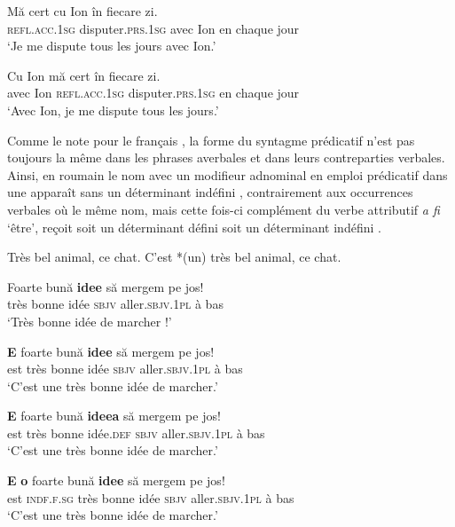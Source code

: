 \ea \label{ch1:ex35}
\ea
\gll   Mă  cert  cu  Ion  în  fiecare  zi.\\
\textsc{refl.acc.1sg} disputer.\textsc{prs.1sg}  avec  Ion  en  chaque  jour\\
\glt ‘Je me dispute tous les jours avec Ion.’ 

\ex
\gll  Cu  Ion  mă  cert  în  fiecare  zi.\\
  avec  Ion  \textsc{refl.acc.1sg} disputer.\textsc{prs.1sg}  en  chaque  jour\\
\glt ‘Avec Ion, je me dispute tous les jours.’ 
\z
\z

Comme le note \citet{Laurens2008} pour le français , la forme du syntagme prédicatif n’est pas toujours la même dans les phrases averbales et dans leurs contreparties verbales. Ainsi, en roumain le nom avec un modifieur adnominal en emploi prédicatif dans une  apparaît sans un déterminant indéfini , contrairement aux occurrences verbales  où le même nom, mais cette fois-ci complément du verbe attributif \textit{a fi} ‘être’, reçoit soit un déterminant défini  soit un déterminant indéfini .

\ea \label{ch1:ex36}
\ea  Très bel animal, ce chat.  
\ex  C’est *(un) très bel animal, ce chat.
\z
\z

\ea
\ea
\gll Foarte  bună  \textbf{idee}  să  mergem  pe  jos! \label{ch1:ex37a}\\
très  bonne  idée  \textsc{sbjv}  aller.\textsc{sbjv.1pl}  à  bas\\
\glt ‘Très bonne idée de marcher !’ 

\ex
\gll  *\textbf{E}  foarte  bună  \textbf{idee}  să  mergem  pe  jos! \label{ch1:ex37b}\\
  est  très  bonne  idée  \textsc{sbjv}  aller.\textsc{sbjv.1pl}  à  bas \\
\glt ‘C’est une très bonne idée de marcher.’ 

\ex 
\gll  \textbf{E}  foarte  bună  \textbf{ideea}  să  mergem  pe  jos! \label{ch1:ex37c}\\
  est  très  bonne  idée.\textsc{def}  \textsc{sbjv}  aller.\textsc{sbjv.1pl}  à  bas\\
\glt ‘C’est une très bonne idée de marcher.’ 

\ex
\gll   \textbf{E}  \textbf{o}  foarte  bună  \textbf{idee}  să  mergem  pe  jos! \label{ch1:ex37d} \\
  est  \textsc{indf.f.sg}  très  bonne  idée  \textsc{sbjv}  aller.\textsc{sbjv.1pl}  à  bas\\
\glt ‘C’est une très bonne idée de marcher.’ 
\z
\z

